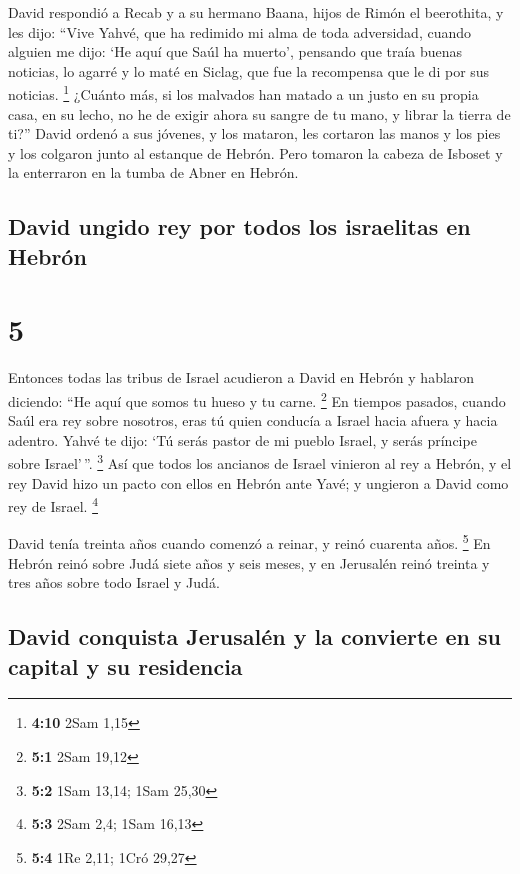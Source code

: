  David respondió a Recab y a su hermano Baana, hijos de
Rimón el beerothita, y les dijo: ``Vive Yahvé, que ha redimido mi alma
de toda adversidad,  cuando alguien me dijo: `He aquí que
Saúl ha muerto', pensando que traía buenas noticias, lo agarré y lo maté
en Siclag, que fue la recompensa que le di por sus noticias. \footnote{\textbf{4:10}
  2Sam 1,15}  ¿Cuánto más, si los malvados han matado a
un justo en su propia casa, en su lecho, no he de exigir ahora su sangre
de tu mano, y librar la tierra de ti?''  David ordenó a
sus jóvenes, y los mataron, les cortaron las manos y los pies y los
colgaron junto al estanque de Hebrón. Pero tomaron la cabeza de Isboset
y la enterraron en la tumba de Abner en Hebrón.

\hypertarget{david-ungido-rey-por-todos-los-israelitas-en-hebruxf3n}{%
\subsection{David ungido rey por todos los israelitas en
Hebrón}\label{david-ungido-rey-por-todos-los-israelitas-en-hebruxf3n}}

\hypertarget{section-4}{%
\section{5}\label{section-4}}

 Entonces todas las tribus de Israel acudieron a David en
Hebrón y hablaron diciendo: ``He aquí que somos tu hueso y tu carne.
\footnote{\textbf{5:1} 2Sam 19,12}  En tiempos pasados,
cuando Saúl era rey sobre nosotros, eras tú quien conducía a Israel
hacia afuera y hacia adentro. Yahvé te dijo: `Tú serás pastor de mi
pueblo Israel, y serás príncipe sobre Israel'\,''. \footnote{\textbf{5:2}
  1Sam 13,14; 1Sam 25,30}  Así que todos los ancianos de
Israel vinieron al rey a Hebrón, y el rey David hizo un pacto con ellos
en Hebrón ante Yavé; y ungieron a David como rey de Israel. \footnote{\textbf{5:3}
  2Sam 2,4; 1Sam 16,13}

 David tenía treinta años cuando comenzó a reinar, y reinó
cuarenta años. \footnote{\textbf{5:4} 1Re 2,11; 1Cró 29,27}
 En Hebrón reinó sobre Judá siete años y seis meses, y en
Jerusalén reinó treinta y tres años sobre todo Israel y Judá.

\hypertarget{david-conquista-jerusaluxe9n-y-la-convierte-en-su-capital-y-su-residencia}{%
\subsection{David conquista Jerusalén y la convierte en su capital y su
residencia}\label{david-conquista-jerusaluxe9n-y-la-convierte-en-su-capital-y-su-residencia}}


